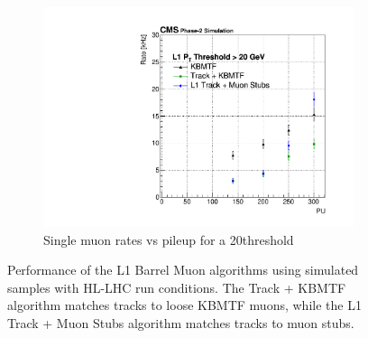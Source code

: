 \begin{figure} [htb!]
\begin{subfigure}[h]{0.45\linewidth}
		\includegraphics[width=\linewidth]{figs/04_muons/rateVsPU_TPS.pdf}
		\caption{Single muon rates vs pileup for a 20\GeV threshold~\cite{CERN-LHCC-2020-004}}
		\label{}
	\end{subfigure}
	\caption[Performance of the L1 Barrel Muon algorithms using simulated samples with HL-LHC run conditions. The Track + KBMTF algorithm matches tracks to loose KBMTF muons, while the L1 Track + Muon Stubs algorithm matches tracks to muon stubs.]{Performance of the L1 Barrel Muon algorithms using simulated samples with HL-LHC run conditions. The Track + KBMTF algorithm matches tracks to loose KBMTF muons, while the L1 Track + Muon Stubs algorithm matches tracks to muon stubs.}
	\label{fig:rate_eff_HLLHC}
\end{figure}